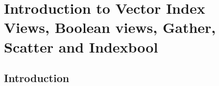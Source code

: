 \chapter{Introduction to Vector Index Views, Boolean views, Gather, Scatter and Indexbool}
\section{Introduction}
